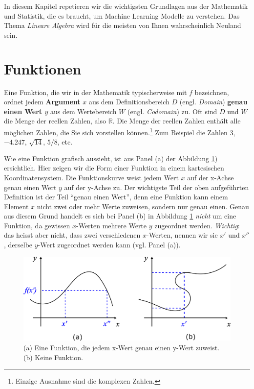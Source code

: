 \documentclass[
]{book}
\begin{document}
In diesem Kapitel repetieren wir die wichtigsten Grundlagen aus der Mathematik und Statistik, die es braucht, um Machine Learning Modelle zu verstehen. Das Thema \emph{Lineare Algebra} wird für die meisten von Ihnen wahrscheinlich Neuland sein.

\hypertarget{funktionen}{%
\section{Funktionen}\label{funktionen}}

Eine Funktion, die wir in der Mathematik typischerweise mit \(f\) bezeichnen, ordnet jedem \textbf{Argument} \(x\) aus dem Definitionsbereich \(D\) (engl. \emph{Domain}) \textbf{genau einen Wert \(y\)} aus dem Wertebereich \(W\) (engl. \emph{Codomain}) zu. Oft sind \(D\) und \(W\) die Menge der reellen Zahlen, also \(\mathbb{R}\). Die Menge der reellen Zahlen enthält alle möglichen Zahlen, die Sie sich vorstellen können.\footnote{Einzige Ausnahme sind die komplexen Zahlen.} Zum Beispiel die Zahlen \(3\), \(-4.247\), \(\sqrt{14}\), \(5/8\), etc.

Wie eine Funktion grafisch aussieht, ist aus Panel (a) der Abbildung \ref{fig:functions}) ersichtlich. Hier zeigen wir die Form einer Funktion in einem kartesischen Koordinatensystem. Die Funktionskurve weist jedem Wert \(x\) auf der x-Achse genau einen Wert \(y\) auf der y-Achse zu. Der wichtigste Teil der oben aufgeführten Definition ist der Teil ``genau einen Wert'', denn eine Funktion kann einem Element \(x\) nicht zwei oder mehr Werte zuweisen, sondern nur genau einen. Genau aus diesem Grund handelt es sich bei Panel (b) in Abbildung \ref{fig:functions} \emph{nicht} um eine Funktion, da gewissen \(x\)-Werten mehrere Werte \(y\) zugeordnet werden. \emph{Wichtig}: das heisst aber nicht, dass zwei verschiedenen \(x\)-Werten, nennen wir sie \(x'\) und \(x''\), derselbe \(y\)-Wert zugeordnet werden kann (vgl. Panel (a)).

\begin{figure}

{\centering \includegraphics[width=0.8\linewidth]{images/Functions} 

}

\caption{(a) Eine Funktion, die jedem x-Wert genau einen y-Wert zuweist. (b) Keine Funktion. }\label{fig:functions}
\end{figure}
\end{document}
